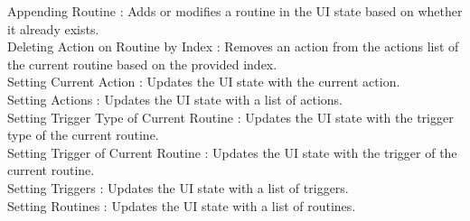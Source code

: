 \begin{enumerate}
                              Appending Routine : Adds or modifies a routine in the UI state based on whether it already exists.\\

                              Deleting Action on Routine by Index : Removes an action from the actions list of the current routine based on the provided index.\\

                              Setting Current Action : Updates the UI state with the current action.\\

                              Setting Actions : Updates the UI state with a list of actions.\\

                              Setting Trigger Type of Current Routine : Updates the UI state with the trigger type of the current routine.\\

                              Setting Trigger of Current Routine : Updates the UI state with the trigger of the current routine.\\

                              Setting Triggers : Updates the UI state with a list of triggers.\\

                              Setting Routines : Updates the UI state with a list of routines.\\


\end{enumerate}
